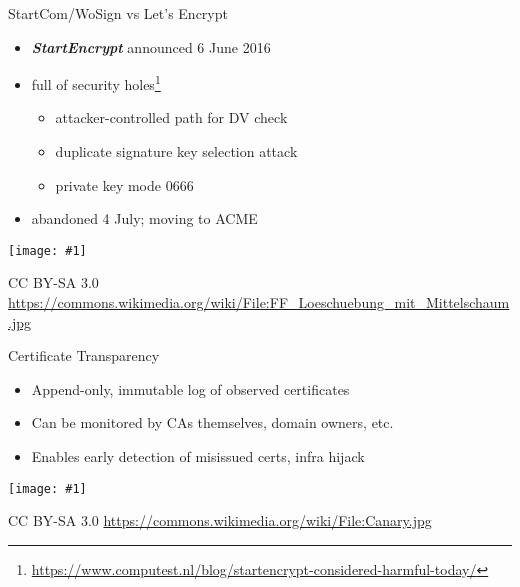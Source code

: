 \documentclass[ignorenonframetext,aspectratio=169]{beamer}
\makeatletter
\def\maxwidth{\ifdim\Gin@nat@width>\linewidth\linewidth\else\Gin@nat@width\fi}
\def\maxheight{\ifdim\Gin@nat@height>\textheight0.8\textheight\else\Gin@nat@height\fi}
\newcommand{\includegraphicsscaled}[1]{
    \texttt{[image: \#1]}
}
\makeatother
\begin{document}
\begin{frame}{StartCom/WoSign vs Let's Encrypt}

\begin{itemize}
\item
  \textbf{\emph{StartEncrypt}} announced 6 June 2016
\item
  full of security holes\footnote{
    \url{https://www.computest.nl/blog/startencrypt-considered-harmful-today/}}

  \begin{itemize}
  \item
    attacker-controlled path for DV check
  \item
    duplicate signature key selection attack
  \item
    private key mode 0666
  \end{itemize}
\item
  abandoned 4 July; moving to ACME
\end{itemize}

\end{frame}

\begin{frame}[plain]

\begin{center}
\includegraphicsscaled{FF_Loeschuebung_mit_Mittelschaum.jpg}
\end{center}

\tiny

CC BY-SA 3.0
\url{https://commons.wikimedia.org/wiki/File:FF_Loeschuebung_mit_Mittelschaum.jpg}

\end{frame}

\begin{frame}{Certificate Transparency}

\begin{itemize}
\item
  Append-only, immutable log of observed certificates
\item
  Can be monitored by CAs themselves, domain owners, etc.
\item
  Enables early detection of misissued certs, infra hijack
\end{itemize}

\end{frame}

\begin{frame}[plain]

\begin{center}
\includegraphicsscaled{Canary.jpg}
\end{center}

\tiny

CC BY-SA 3.0 \url{https://commons.wikimedia.org/wiki/File:Canary.jpg}

\end{frame}
\end{document}
